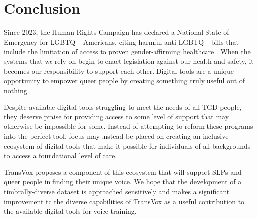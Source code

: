 \documentclass{article}
\begin{document}
\section{Conclusion}\label{sec:page_size}

Since 2023, the Human Rights Campaign has declared a National State of Emergency for LGBTQ+ Americans, citing harmful anti-LGBTQ+ bills that include the limitation of access to proven gender-affirming healthcare \cite{hrc2024}. When the systems that we rely on begin to enact legislation against our health and safety, it becomes our responsibility to support each other. Digital tools are a unique opportunity to empower queer people by creating something truly useful out of nothing.

Despite available digital tools struggling to meet the needs of all TGD people, they deserve praise for providing access to some level of support that may otherwise be impossible for some. Instead of attempting to reform these programs into the perfect tool, focus may instead be placed on creating an inclusive ecosystem of digital tools that make it possible for individuals of all backgrounds to access a foundational level of care.

TransVox proposes a component of this ecosystem that will support SLPs and queer people in finding their unique voice. We hope that the development of a timbrally-diverse dataset is approached sensitively and makes a significant improvement to the diverse capabilities of TransVox as a useful contribution to the available digital tools for voice training.




\end{document}
